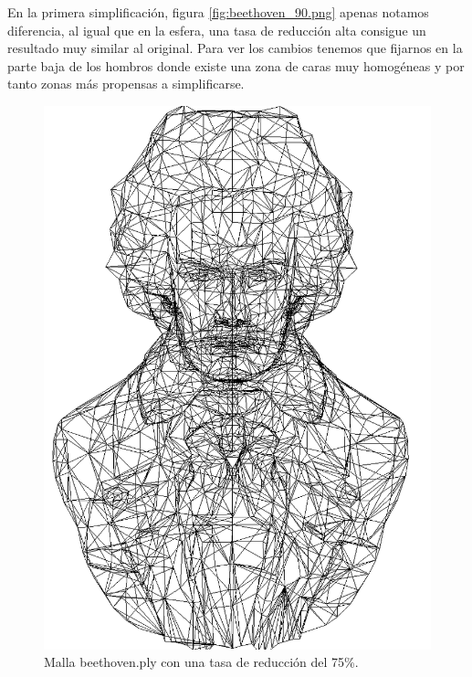 En la primera simplificación, figura \ref{fig:beethoven_90.png} apenas notamos diferencia, al igual que en la esfera, una tasa de reducción alta consigue un resultado muy similar al original. Para ver los cambios tenemos que fijarnos en la parte baja de los hombros donde existe una zona de caras muy homogéneas y por tanto zonas más propensas a simplificarse.
\begin{figure} %
	\centering
	\includegraphics[scale=0.25]{imagenes/beethoven_75.png} 
	\caption{Malla beethoven.ply con una tasa de reducción del 75\%.} \label{fig:beethoven_75.png}
\end{figure}

